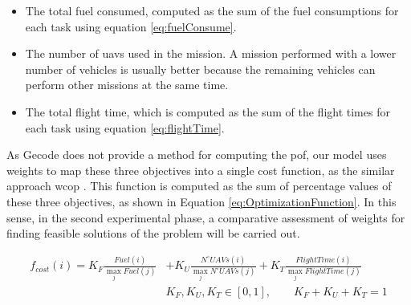 \begin{itemize}
	\item The total fuel consumed, computed as the sum of the fuel consumptions for each task using equation \ref{eq:fuelConsume}.
	
	\item The number of \glspl{uav} used in the mission. A mission performed with a lower number of vehicles is usually better because the remaining vehicles can perform other missions at the same time.
	
	\item The total flight time,  which is computed as the sum of the flight times for each task using equation \ref{eq:flightTime}.
\end{itemize}

As Gecode does not provide a method for computing the \gls{pof}, our model uses weights to map these three objectives into a single cost function, as the similar approach \gls{wcop} \cite{TorrensEtAl02}. This function is computed as the sum of percentage values of these three objectives, as shown in Equation \ref{eq:OptimizationFunction}. In this sense, in the second experimental phase, a comparative assessment of weights for finding feasible solutions of the problem will be carried out.

\begin{align}\label{eq:OptimizationFunction}
  f_{cost}(i) = K_{F}\frac{Fuel(i)}{\max_j{Fuel(j)}} &+ K_{U}\frac{N^{\circ}UAVs(i)}{\max_j{N^{\circ}UAVs(j)}} + K_{T}\frac{Flight Time(i)}{\max_j{Flight Time(j)}}\nonumber \\[1em]
  & K_{F},K_{U},K_{T}\in[0,1],\qquad K_{F}+K_{U}+K_{T}=1
\end{align}